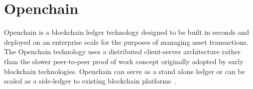 \section{Openchain}

Openchain is a blockchain ledger technology designed to be built in seconds and
deployed on an enterprise scale for the purposes of managing asset
transactions. The Openchain technology uses a distributed client-server
architecture rather than the slower peer-to-peer proof of work concept
originally adopted by early blockchain technologies. Openchain can serve as a
stand alone ledger or can be scaled as a side-ledger to existing blockchain
platforms~\cite{Openchain}.
